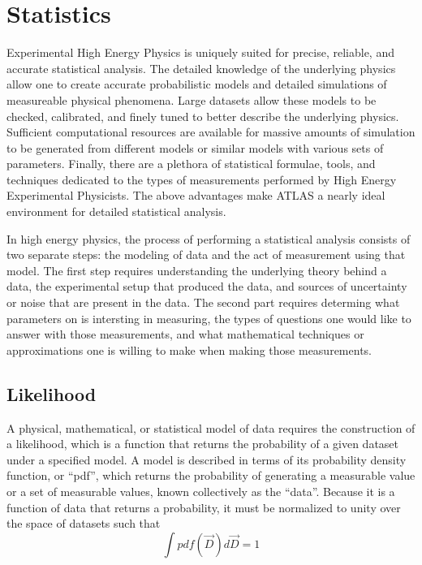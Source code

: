 

\section{Statistics}

Experimental High Energy Physics is uniquely suited for precise, reliable, and accurate statistical analysis.
The detailed knowledge of the underlying physics allow one to create accurate probabilistic models and detailed simulations of measureable physical phenomena.
Large datasets allow these models to be checked, calibrated, and finely tuned to better describe the underlying physics.
Sufficient computational resources are available for massive amounts of simulation to be generated from different models or similar models with various sets of parameters.
Finally, there are a plethora of statistical formulae, tools, and techniques dedicated to the types of measurements performed by High Energy Experimental Physicists.
The above advantages make ATLAS a nearly ideal environment for detailed statistical analysis.


In high energy physics, the process of performing a statistical analysis consists of two separate steps: the modeling of data and the act of measurement using that model.
The first step requires understanding the underlying theory behind a data, the experimental setup that produced the data, and sources of uncertainty or noise that are present in the data.
The second part requires determing what parameters on is intersting in measuring, the types of questions one would like to answer with those measurements, and what mathematical techniques or approximations one is willing to make when making those measurements.


\subsection{Likelihood}
A physical, mathematical, or statistical model of data requires the construction of a likelihood, which is a function that returns the probability of a given dataset under a specified model.
A model is described in terms of its probability density function, or ``pdf'', which returns the probability of generating a measurable value or a set of measurable values, known collectively as the ``data''.
Because it is a function of data that returns a probability, it must be normalized to unity over the space of datasets such that
\begin{equation}
\int pdf(\vec{D}) d\vec{D} = 1
\end{equation}

